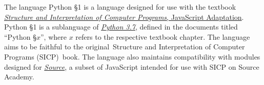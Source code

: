 The language Python \S 1 is a language designed for use with the textbook
\href{https://sourceacademy.org/sicpjs/}{\color{DarkBlue}\emph{Structure and Interpretation
of Computer Programs}, JavaScript Adaptation}.
Python \S 1 is a sublanguage of \href{https://docs.python.org/3.7/reference/grammar.html}{\color{DarkBlue}\emph{Python 3.7}}, defined in the documents titled ``Python \S $x$'', where $x$ refers to the
respective textbook chapter. The language aims to be faithful to the original\ Structure and Interpretation
of Computer Programs (SICP)\ book. The language also maintains compatibility with modules designed for \href{https://docs.sourceacademy.org/source_1/}{\color{DarkBlue}\emph{Source}}, a subset of JavaScript intended for use with SICP on Source Academy.
